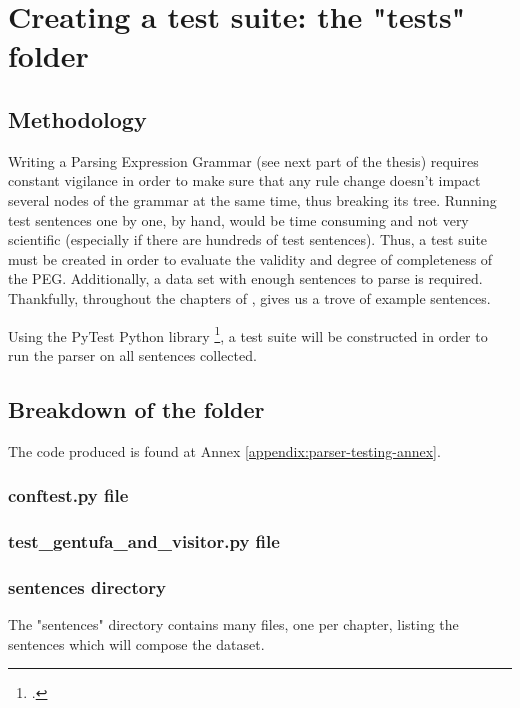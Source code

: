 \chapter{Creating a test suite: the "tests" folder}
\label{chap:creating_a_test_suite}

\section{Methodology}

Writing a Parsing Expression Grammar (see next part of the thesis) requires constant vigilance in order to make sure
that any rule change doesn't impact several nodes of the grammar at the same time, thus breaking its tree. Running test
sentences one by one, by hand, would be time consuming and not very scientific (especially if there are hundreds of test sentences).
Thus, a test suite must be created in order to evaluate the validity and degree of completeness of the PEG.
Additionally, a data set with enough sentences to parse is required. Thankfully, throughout the chapters of ,
\citeauthor{cowan1997complete} gives us a trove of example sentences.\newline

Using the PyTest Python library \footcite{pytest8.3.2}, a test suite will be constructed in order to run the parser on
all sentences collected.

\section{Breakdown of the folder}

The code produced is found at Annex \ref{appendix:parser-testing-annex}.

\subsection*{conftest.py file}

\subsection*{test\_gentufa\_and\_visitor.py file}

\subsection*{sentences directory}

The "sentences" directory contains many files, one per chapter, listing the sentences which will compose the dataset.

